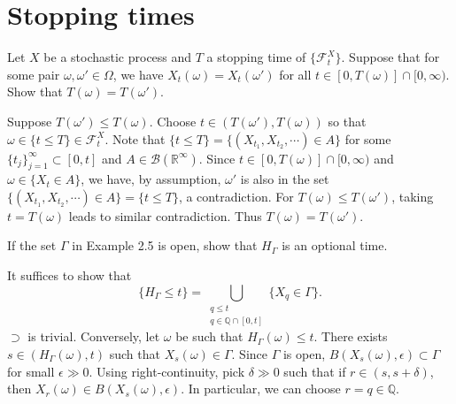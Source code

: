 \documentclass{report}
\begin{document}
\section{Stopping times}
\setcounter{exe}{1}
\begin{prob}
	Let \( X \) be a stochastic process and \( T \) a stopping time of \( \{\mathscr{F}_t^X\}. \)
	Suppose that for some pair \( \omega, \omega' \in \Omega \), we have \( X_t(\omega)=X_t(\omega') \) for all \( t\in [0,T(\omega)]\cap[0,\infty) \).
	Show that \( T(\omega)=T(\omega') \).
\end{prob}
\begin{prf}
	Suppose \( T(\omega')\le T(\omega) \).
	Choose \( t\in(T(\omega'), T(\omega)) \) so that \( \omega \in \{t\le T\} \in \mathscr{F}_t^X \).
	Note that \( \{t\le T\}=\{(X_{t_1},X_{t_2},\dotsm)\in A\} \) for some \( \{t_j \} _{j=1}^{\infty} \subset [0,t] \) and \( A\in \mathscr{B}(\mathbb{R}^{\infty}) \).
	Since \( t\in [0,T(\omega)] \cap [0,\infty) \) and \( \omega \in \{X_t\in A\} \),
	we have, by assumption, \( \omega' \) is also in the set \( \{(X_{t_1},X_{t_2},\dotsm)\in A\}=\{t\le T\} \), a contradiction.
	For \( T(\omega)\le T(\omega') \), taking \( t=T(\omega) \) leads to similar contradiction. Thus \( T(\omega)=T(\omega') \).
\end{prf}

\setcounter{exe}{5}
\begin{prob}
	If the set \( \Gamma \) in Example 2.5 is open, show that \( H_{\Gamma} \) is an optional time.
\end{prob}
\begin{prf}
	It suffices to show that
	\[
		\{H_{\Gamma} \le t\}=\bigcup_{\substack{q\le t \\ q\in \mathbb{Q}\cap [0,t]}}\{X_q \in \Gamma \}.
	\]
	\( \supset \) is trivial. Conversely, let \( \omega \) be such that \( H_{\Gamma}(\omega) \le t. \) There exists \( s\in (H_{\Gamma}(\omega), t) \) such that 
	\( X_s(\omega)\in \Gamma. \)
	Since \( \Gamma \) is open, \( B(X_s(\omega), \epsilon)\subset \Gamma \) for small \( \epsilon \gg 0. \) Using right-continuity, pick \( \delta \gg0 \) such that
	if \( r\in (s,s+\delta) \), then \( X_r(\omega)\in B(X_s(\omega), \epsilon) \).
	In particular, we can choose \( r=q\in \mathbb{Q} \).
\end{prf}
\end{document}
